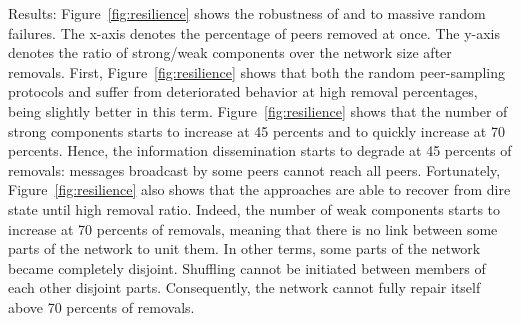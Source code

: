 \begin{asparadesc}
\item[Results:] Figure~\ref{fig:resilience} shows the robustness of \SPRAY and
  \CYCLON to massive random failures. The x-axis denotes the percentage of peers
  removed at once. The y-axis denotes the ratio of strong/weak components over
  the network size after removals. First, Figure~\ref{fig:resilience} shows that
  both the random peer-sampling protocols \SPRAY and \CYCLON suffer from
  deteriorated behavior at high removal percentages, \CYCLON being slightly
  better in this term. Figure~\ref{fig:resilience} shows that the number of
  strong components starts to increase at 45 percents and to quickly increase at
  70 percents. Hence, the information dissemination starts to degrade at 45
  percents of removals: messages broadcast by some peers cannot reach all peers.
  Fortunately, Figure~\ref{fig:resilience} also shows that the approaches are
  able to recover from dire state until high removal ratio. Indeed, the number
  of weak components starts to increase at 70 percents of removals, meaning that
  there is no link between some parts of the network to unit them. In other
  terms, some parts of the network became completely disjoint. Shuffling cannot
  be initiated between members of each other disjoint parts. Consequently, the
  network cannot fully repair itself above 70 percents of removals.


\end{asparadesc}
